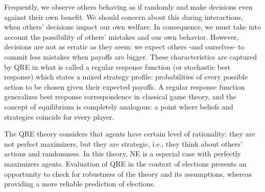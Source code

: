 Frequently, we observe others behaving as if randomly and make decisions even against their own benefit. 
We should concern about this during interactions, when others' decisions impact our own welfare. 
In consequence, we must take into account the possibility of others' mistakes and our own behavior. 
However, decisions are not as erratic as they seem: 
we expect others -and ourselves- to commit less mistakes when payoffs are bigger. 
These characteristics are captured by QRE in what is called a regular response function (or stochastic best response) which states a mixed strategy profile: 
probabilities of every possible action to be chosen given their expected payoffs. 
A regular response function generalizes best response correspondence in classical game theory, and the concept of equilibrium is completely analogous: 
a point where beliefs and strategies coincide for every player.

The QRE theory considers that agents have certain level of rationality: they are not perfect maximizers, but they are strategic, i.e., they think about others' actions and randomness. 
In this theory, NE is a especial case with perfectly maximizers agents. %
Evaluation of QRE in the context of elections presents an opportunity to check for robustness of the theory and its assumptions, 
whereas providing a more reliable prediction of elections. 







%




